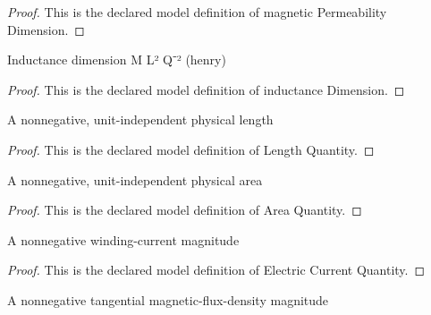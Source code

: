 \begin{proof}
  This is the declared model definition of magnetic Permeability Dimension.
\end{proof}
\begin{definition}
  \label{def:physics:phyx-mini-0922:phyxminiproblems-problemphyxmini0922-inductancedimension}
  Inductance dimension M L² Q⁻² (henry)
\end{definition}
\begin{proof}
  This is the declared model definition of inductance Dimension.
\end{proof}
\begin{definition}
  \label{def:physics:phyx-mini-0922:phyxminiproblems-problemphyxmini0922-lengthquantity}
  A nonnegative, unit-independent physical length
\end{definition}
\begin{proof}
  This is the declared model definition of Length Quantity.
\end{proof}
\begin{definition}
  \label{def:physics:phyx-mini-0922:phyxminiproblems-problemphyxmini0922-areaquantity}
  A nonnegative, unit-independent physical area
\end{definition}
\begin{proof}
  This is the declared model definition of Area Quantity.
\end{proof}
\begin{definition}
  \label{def:physics:phyx-mini-0922:phyxminiproblems-problemphyxmini0922-electriccurrentquantity}
  A nonnegative winding-current magnitude
\end{definition}
\begin{proof}
  This is the declared model definition of Electric Current Quantity.
\end{proof}
\begin{definition}
  \label{def:physics:phyx-mini-0922:phyxminiproblems-problemphyxmini0922-magneticfluxdensityquantity}
  A nonnegative tangential magnetic-flux-density magnitude
\end{definition}
